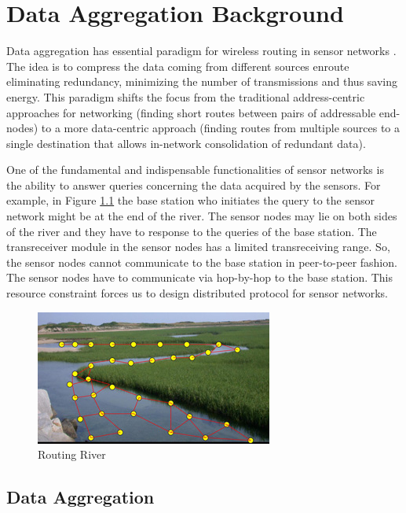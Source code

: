 \chapter{Data Aggregation Background} %
\label{cha:Data Aggregation Background}

	Data aggregation has essential paradigm for wireless routing in sensor networks \cite{krishnamachari2002impact}. 
	The idea is to compress the data coming from different sources enroute eliminating redundancy, minimizing the number of transmissions and thus saving energy.
	This paradigm shifts the focus from the traditional address-centric approaches for networking (finding short routes between pairs
	of addressable end-nodes) to a more data-centric approach (finding routes from multiple sources to a single destination that allows in-network consolidation of redundant data).

	One of the fundamental and indispensable functionalities of sensor networks is the ability to answer queries concerning the data acquired by the sensors. 
	For example, in Figure \ref{fig:Routing River} \cite{RoutingRiver} the base station who initiates the query to the sensor network might be at the end of the river.
	The sensor nodes may lie on both sides of the river and they have to response to the queries of the base station.
	The transreceiver module in the sensor nodes has a limited transreceiving range. 
	So, the sensor nodes cannot communicate to the base station in peer-to-peer fashion.
	The sensor nodes have to communicate via hop-by-hop to the base station.
	This resource constraint forces us to design distributed protocol for sensor networks.  
	\begin{figure}[h!]
		\centering
		\includegraphics[scale = 2]{images/routing-river.jpg}
		\caption{Routing River}
		\label{fig:Routing River}
	\end{figure}

\section{Data Aggregation}

